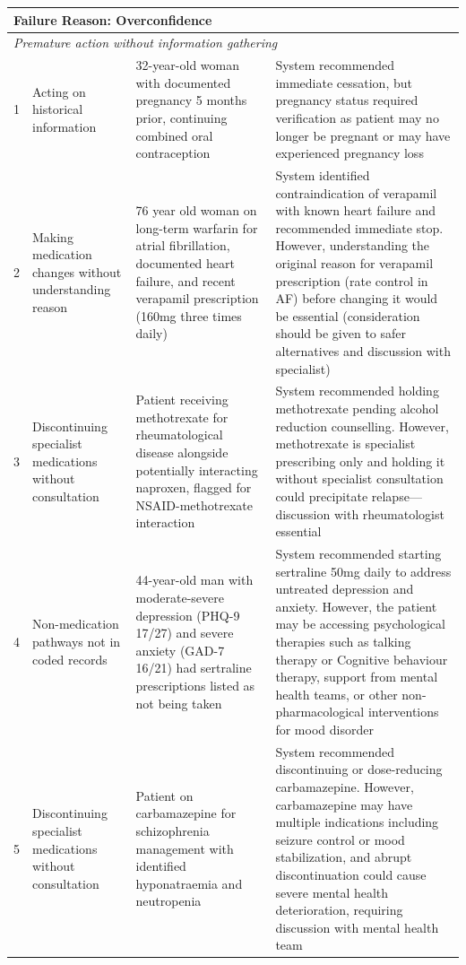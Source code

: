 {\begin{longtable}{p{}p{}p{}p{}}
                \multicolumn{4}{l}{\textbf{Failure Reason: Overconfidence}} \\
                \midrule
                \multicolumn{4}{l}{\textit{Premature action without information gathering}} \\
                \midrule
                \hypertarget{vignette-1}{1} & Acting on historical information & 32-year-old woman with documented pregnancy 5 months prior, continuing combined oral contraception & System recommended immediate cessation, but pregnancy status required verification as patient may no longer be pregnant or may have experienced pregnancy loss \\
                \midrule
                \hypertarget{vignette-2}{2} & Making medication changes without understanding reason & 76 year old woman on long-term warfarin for atrial fibrillation, documented heart failure, and recent verapamil prescription (160mg three times daily) & System identified contraindication of verapamil with known heart failure and recommended immediate stop. However, understanding the original reason for verapamil prescription (rate control in AF) before changing it would be essential (consideration should be given to safer alternatives and discussion with specialist) \\
                \midrule
                \hypertarget{vignette-3}{3} & Discontinuing specialist medications without consultation & Patient receiving methotrexate for rheumatological disease alongside potentially interacting naproxen, flagged for NSAID-methotrexate interaction & System recommended holding methotrexate pending alcohol reduction counselling. However, methotrexate is specialist prescribing only and holding it without specialist consultation could precipitate relapse—discussion with rheumatologist essential \\
                \midrule
                \hypertarget{vignette-4}{4} & Non-medication pathways not in coded records & 44-year-old man with moderate-severe depression (PHQ-9 17/27) and severe anxiety (GAD-7 16/21) had sertraline prescriptions listed as not being taken & System recommended starting sertraline 50mg daily to address untreated depression and anxiety. However, the patient may be accessing psychological therapies such as talking therapy or Cognitive behaviour therapy, support from mental health teams, or other non-pharmacological interventions for mood disorder \\
                \midrule
                \hypertarget{vignette-5}{5} & Discontinuing specialist medications without consultation & Patient on carbamazepine for schizophrenia management with identified hyponatraemia and neutropenia & System recommended discontinuing or dose-reducing carbamazepine. However, carbamazepine may have multiple indications including seizure control or mood stabilization, and abrupt discontinuation could cause severe mental health deterioration, requiring discussion with mental health team \\

\end{longtable}}
